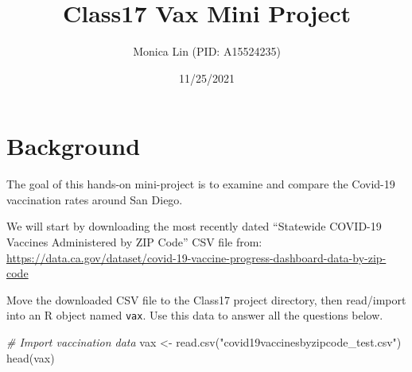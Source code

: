 \documentclass[
]{article}
\title{Class17 Vax Mini Project}
\author{Monica Lin (PID: A15524235)}
\date{11/25/2021}
\newenvironment{Shaded}{\begin{snugshade}}{\end{snugshade}}
\newcommand{\CommentTok}[1]{\textcolor[rgb]{0.56,0.35,0.01}{\textit{#1}}}
\newcommand{\FunctionTok}[1]{\textcolor[rgb]{0.00,0.00,0.00}{#1}}
\newcommand{\NormalTok}[1]{#1}
\newcommand{\OtherTok}[1]{\textcolor[rgb]{0.56,0.35,0.01}{#1}}
\newcommand{\StringTok}[1]{\textcolor[rgb]{0.31,0.60,0.02}{#1}}
\begin{document}
\maketitle

\hypertarget{background}{%
\section{Background}\label{background}}

The goal of this hands-on mini-project is to examine and compare the
Covid-19 vaccination rates around San Diego.

We will start by downloading the most recently dated ``Statewide
COVID-19 Vaccines Administered by ZIP Code'' CSV file from:
\url{https://data.ca.gov/dataset/covid-19-vaccine-progress-dashboard-data-by-zip-code}

Move the downloaded CSV file to the Class17 project directory, then
read/import into an R object named \texttt{vax}. Use this data to answer
all the questions below.

\begin{Shaded}
\begin{Highlighting}[]
\CommentTok{\# Import vaccination data}
\NormalTok{vax }\OtherTok{\textless{}{-}} \FunctionTok{read.csv}\NormalTok{(}\StringTok{"covid19vaccinesbyzipcode\_test.csv"}\NormalTok{)}
\FunctionTok{head}\NormalTok{(vax)}
\end{Highlighting}
\end{Shaded}
\end{document}
